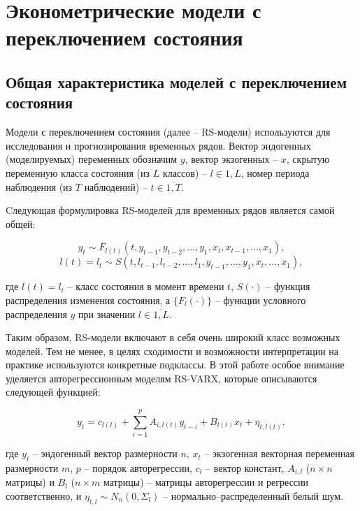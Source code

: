 \documentclass[a4paper,14pt]{extreport}
\begin{document}
\chapter{Эконометрические модели с переключением состояния}

\label{chapter:rs_models}

\section{Общая характеристика моделей с переключением состояния}
Модели с переключением состояния (далее – RS-модели) используются для исследования и прогнозирования временных рядов. Вектор эндогенных (моделируемых) переменных обозначим $y$, вектор экзогенных -- $x$, скрытую переменную класса состояния (из $L$ классов) -- $l \in \overline{1, L}$, номер периода наблюдения (из $T$ наблюдений) -- $t \in \overline{1,T}$.

Cледующая формулировка RS-моделей для временных рядов является самой общей:

\begin{equation}
	y_t \sim F_{l(t)}(t, y_{t-1}, y_{t-2}, \dots, y_1, x_t, x_{t-1}, \dots, x_1) ,
\end{equation}
\begin{equation}
	l(t) = l_t \sim S(t, l_{t-1}, l_{t-2}, \dots, l_1, y_{t-1}, \dots, y_1, x_t, \dots, x_1) ,
\end{equation}

\noindent
где $l(t) = l_t$ -- класс состояния в момент времени $t$, $S(\cdot)$ -- функция распределения изменения состояния, а $\{F_l(\cdot)\}$ -- функции условного распределения $y$ при значении $l \in \overline{1,L}$. 

Таким образом, RS-модели включают в себя очень широкий класс возможных моделей. Тем не менее, в целях сходимости и возможности интерпретации на практике используются конкретные подклассы. В этой работе особое внимание уделяется авторегрессионным моделям RS-VARX, которые описываются следующей функцией:

\begin{equation}
	y_{t}=c_{l(t)} + \sum_{i=1}^{p} A_{i,l(t)} y_{t-i} + B_{l(t)} x_{t} + \eta_{t, l(t)} ,
\end{equation}

\noindent
где 
$y_t$ -- эндогенный вектор размерности $n$, 
$x_{t}$ -- экзогенная векторная переменная размерности $m$,
$p$ -- порядок авторегрессии, 
$c_{l}$ -- вектор констант,
$A_{i,l}$ ($n \times n$ матрицы) и $B_{l}$ ($n \times m$ матрицы) -- матрицы авторегрессии и регрессии соответственно,
и $\eta_{t, l} \sim N_n(0, \Sigma_{l}) $ -- нормально–распределенный белый шум.
\end{document}
